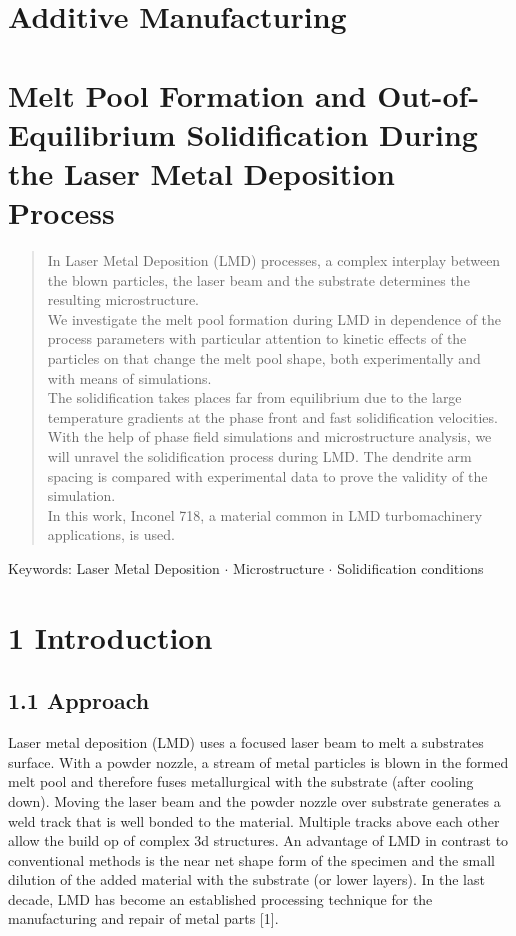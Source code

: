 \documentclass[10pt]{article}
\begin{document}
\section*{Additive Manufacturing}
\section*{Melt Pool Formation and Out-of-Equilibrium Solidification During the Laser Metal Deposition Process }


\begin{abstract}
In Laser Metal Deposition (LMD) processes, a complex interplay between the blown particles, the laser beam and the substrate determines the resulting microstructure.\\
We investigate the melt pool formation during LMD in dependence of the process parameters with particular attention to kinetic effects of the particles on that change the melt pool shape, both experimentally and with means of simulations.\\
The solidification takes places far from equilibrium due to the large temperature gradients at the phase front and fast solidification velocities. With the help of phase field simulations and microstructure analysis, we will unravel the solidification process during LMD. The dendrite arm spacing is compared with experimental data to prove the validity of the simulation.\\
In this work, Inconel 718, a material common in LMD turbomachinery applications, is used.
\end{abstract}

Keywords: Laser Metal Deposition $\cdot$ Microstructure $\cdot$ Solidification conditions

\section*{1 Introduction}
\subsection*{1.1 Approach}
Laser metal deposition (LMD) uses a focused laser beam to melt a substrates surface. With a powder nozzle, a stream of metal particles is blown in the formed melt pool and therefore fuses metallurgical with the substrate (after cooling down). Moving the laser beam and the powder nozzle over substrate generates a weld track that is well bonded to the material. Multiple tracks above each other allow the build op of complex 3d structures. An advantage of LMD in contrast to conventional methods is the near net shape form of the specimen and the small dilution of the added material with the substrate (or lower layers). In the last decade, LMD has become an established processing technique for the manufacturing and repair of metal parts [1].
\end{document}
